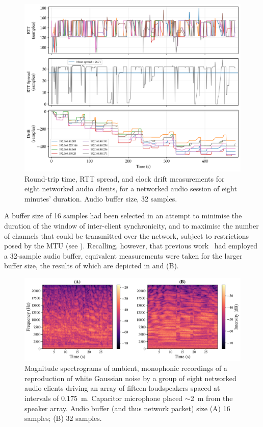 \begin{figure}[ht]
    \centering
    \includegraphics[width=\textwidth]{figures/rtt_drift_32}
    \caption{
        Round-trip time, RTT spread, and clock drift measurements
        for eight networked audio clients, for a networked audio session of
        eight minutes' duration.
        Audio buffer size, 32 samples.
    }
    \label{fig:rtt-drift-32}
\end{figure}

A buffer size of 16 samples had been selected in an attempt to minimise the
duration of the window of inter-client synchronicity, and to maximise the
number of channels that could be transmitted over the network, subject to
restrictions posed by the MTU (see
).
Recalling, however, that previous
work~\citep{rushton_microcontroller-based_2023}
had employed a 32-sample audio buffer, equivalent measurements were taken for
the larger buffer size, the results of which are depicted in
 and (B).

\begin{figure}[ht]
    \centering
    \includegraphics[width=\textwidth]{figures/wgn_specgram_16_32}
    \caption{
        Magnitude spectrograms of ambient, monophonic recordings of a
        reproduction of white Gaussian noise by a group of eight networked
        audio clients driving an array of fifteen loudspeakers spaced at
        intervals of \qty{.175}{\m}.
        Capacitor microphone placed $\sim$\qty{2}{\m} from the
        speaker array.
        Audio buffer (and thus network packet) size (A) 16 samples;
        (B) 32 samples.
    }
    \label{fig:spectrograms}
\end{figure}

